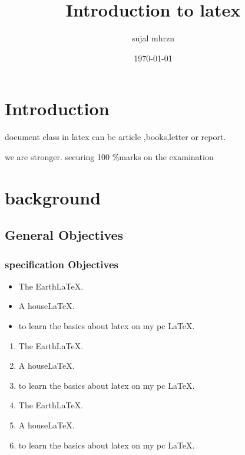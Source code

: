 \documentclass[titlepage]{report}
\title{Introduction to latex}
\author{sujal mhrzn}
\date{\today}
\begin{document}
\maketitle
\tableofcontents
\newpage
\pagestyle{empty}
\lipsum[1]
 

\section*{Introduction}

document class in latex can be article ,books,letter or report.

 we are stronger.
 securing 100 \%marks on the examination 
 \newpage
 \section{background}
 \begin{landscape}
 \lipsum[1]
 \end{landscape}
 \subsection[Intro]{General Objectives}
 \subsubsection{specification Objectives}
 \begin{itemize}
    

 \item The Earth\LaTeX.
\item  A house\LaTeX.
\item to learn the basics about latex on my pc \LaTeX.


\end{itemize}
\begin{enumerate}
 \item The Earth\LaTeX.
\item  A house\LaTeX.
\item to learn the basics about latex on my pc \LaTeX.
 \item The Earth\LaTeX.
\item  A house\LaTeX.
\item to learn the basics about latex on my pc \LaTeX.
\end{enumerate}
\end{document}
